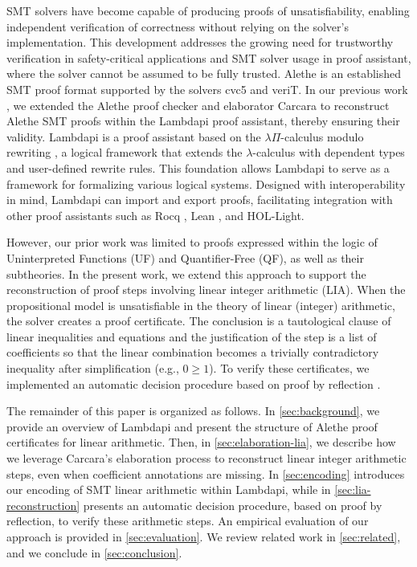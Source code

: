 \documentclass[runningheads]{llncs}
\begin{document}
SMT solvers have become capable of producing proofs of unsatisfiability,  enabling independent verification of correctness without relying on the solver's implementation.
This development addresses the growing need for trustworthy verification in safety-critical applications and SMT solver usage in proof assistant, where the solver cannot be assumed to be fully trusted.
Alethe \cite{alethe,alethespec} is an established SMT proof format supported by the solvers cvc5 and veriT. In our previous work \cite{ColtellacciMD24}, we extended the Alethe proof checker and elaborator Carcara \cite{carcara} to
reconstruct Alethe SMT proofs within the Lambdapi proof assistant, thereby ensuring their validity.
Lambdapi \cite{lambdapi} is a proof assistant based on the $\lambda\Pi$-calculus modulo rewriting \cite{lpmodulo}, a logical framework \cite{lf} that extends the $\lambda$-calculus with dependent types and user-defined rewrite rules.
This foundation allows Lambdapi to serve as a framework for formalizing various logical systems.
Designed with interoperability in mind, Lambdapi can import and export proofs, facilitating integration with other proof assistants \cite{LPAR2024:Translating_HOL_Light_proofs} such as Rocq \cite{Rocq-refman}, Lean \cite{lean4:2021}, and HOL-Light. 

However, our prior work was limited to proofs expressed within the logic of Uninterpreted Functions (UF) and Quantifier-Free (QF), as well as their subtheories. 
In the present work, we extend this approach to support the reconstruction of proof steps involving linear integer arithmetic (LIA).
When the propositional model is unsatisfiable in the theory of linear (integer) arithmetic, the solver creates a proof certificate.
The conclusion is a tautological clause of linear inequalities and equations and the justification of the step is a list of coefficients so that the linear combination becomes a trivially contradictory inequality after simplification (e.g., $0 \geq 1$).
To verify these certificates, we implemented an automatic decision procedure based on proof by reflection \cite{reflection-origin-coq,ring-coq}.


The remainder of this paper is organized as follows.
In \cref{sec:background}, we provide an overview of Lambdapi and present the structure of Alethe proof certificates for linear arithmetic.
Then, in \cref{sec:elaboration-lia}, we describe how we leverage Carcara's elaboration process to reconstruct linear integer arithmetic steps, even when coefficient annotations are missing.
In \cref{sec:encoding} introduces our encoding of SMT linear arithmetic within Lambdapi, while in \cref{sec:lia-reconstruction} presents an automatic decision procedure, based on proof by reflection, to verify these arithmetic steps.
An empirical evaluation of our approach is provided in \cref{sec:evaluation}. We review related work in \cref{sec:related}, and we conclude in \cref{sec:conclusion}.
\end{document}
